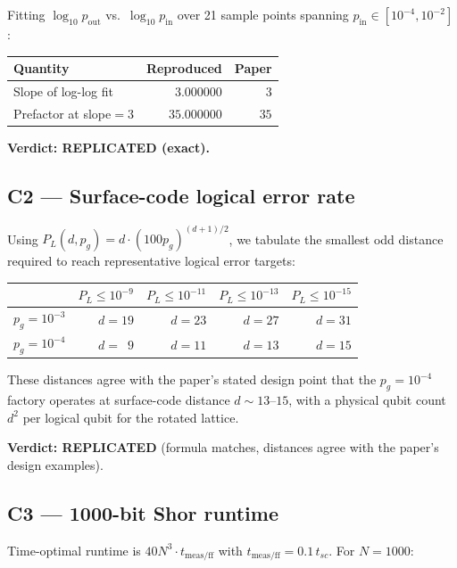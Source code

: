 \documentclass[11pt]{article}
\begin{document}
Fitting $\log_{10} p_{\text{out}}$ vs.\ $\log_{10} p_{\text{in}}$ over
21 sample points spanning $p_{\text{in}}\in[10^{-4},10^{-2}]$:

\begin{center}
\begin{tabular}{lrr}
\toprule
Quantity & Reproduced & Paper \\
\midrule
Slope of log-log fit & $3.000000$ & $3$ \\
Prefactor at slope$=3$ & $35.000000$ & $35$ \\
\bottomrule
\end{tabular}
\end{center}

\textbf{Verdict: REPLICATED (exact).}

\subsection{C2 --- Surface-code logical error rate}
\label{sec:c2}

Using $P_L(d,p_g) = d\cdot(100 p_g)^{(d+1)/2}$, we tabulate the
smallest odd distance required to reach representative logical error
targets:

\begin{center}
\begin{tabular}{lrrrr}
\toprule
 & $P_L\le 10^{-9}$ & $P_L\le 10^{-11}$ & $P_L\le 10^{-13}$ & $P_L\le 10^{-15}$ \\
\midrule
$p_g=10^{-3}$ & $d=19$ & $d=23$ & $d=27$ & $d=31$ \\
$p_g=10^{-4}$ & $d=\phantom{0}9$ & $d=11$ & $d=13$ & $d=15$ \\
\bottomrule
\end{tabular}
\end{center}

These distances agree with the paper's stated design point that the
$p_g=10^{-4}$ factory operates at surface-code distance $d\sim 13$--$15$,
with a physical qubit count $d^{2}$ per logical qubit for the rotated
lattice.

\textbf{Verdict: REPLICATED} (formula matches, distances agree with
the paper's design examples).

\subsection{C3 --- 1000-bit Shor runtime}
\label{sec:c3}

Time-optimal runtime is $40 N^{3} \cdot t_{\text{meas/ff}}$ with
$t_{\text{meas/ff}} = 0.1\,t_{sc}$. For $N=1000$:
\end{document}
